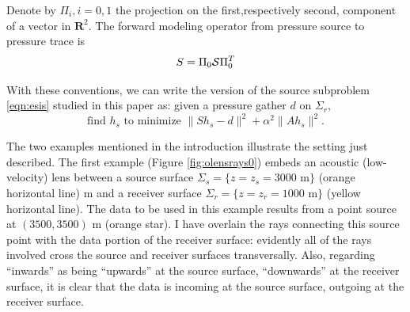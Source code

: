 \documentclass[georeport,12pt]{geophysics}
\newcommand{\bR}{\mathbf{R}}
\begin{document}
Denote by $\Pi_i, i=0,1$ the projection on the first,respectively
second, component of a vector in $\bR^2$. The forward modeling
operator from pressure source to pressure trace is
\begin{equation}
  \label{eqn:sdef}
  S = \Pi_0 {\cal S}\Pi_0^T 
\end{equation}

With these conventions, we can write the version of the source
subproblem \ref{eqn:esis} studied in this paper as: given a pressure
gather $d$ on $\Sigma_r$,
\begin{equation}
  \label{eqn:esisp}
  \mbox{find }h_s\mbox{ to minimize }\|Sh_s- d\|^2 +
  \alpha^2\|Ah_s\|^2.
\end{equation}

The two examples mentioned in the introduction illustrate the setting
just described. The first example (Figure \ref{fig:olensrays0}) embeds
an acoustic (low-velocity) lens between a source surface
$\Sigma_s= \{z = z_s=3000 \mbox{ m}\}$ (orange horizontal line) m and
a receiver surface $\Sigma_r= \{z=z_r=1000 \mbox{ m}\}$ (yellow
horizontal line).  The data to be used in this example results from a
point source at $(3500, 3500)$ m (orange star). I have overlain
the rays connecting this source point with the data portion of the
receiver surface: evidently all of the rays involved cross the source
and receiver surfaces transversally. Also, regarding ``inwards'' as
being ``upwards'' at the source surface, ``downwards'' at the receiver
surface, it is clear that the data is incoming at the source surface,
outgoing at the receiver surface.
\end{document}
